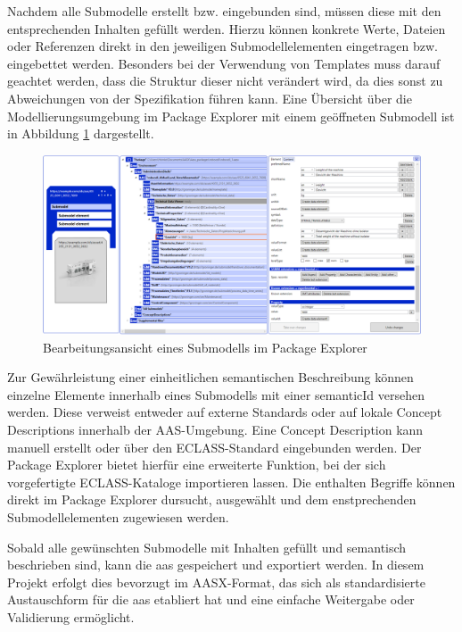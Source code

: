 Nachdem alle Submodelle erstellt bzw. eingebunden sind, müssen diese mit den entsprechenden Inhalten gefüllt werden.
Hierzu können konkrete Werte, Dateien oder Referenzen direkt in den jeweiligen Submodellelementen eingetragen bzw. eingebettet werden.
Besonders bei der Verwendung von Templates muss darauf geachtet werden, dass die Struktur dieser nicht verändert wird, da dies sonst zu Abweichungen von der Spezifikation führen kann.
Eine Übersicht über die Modellierungsumgebung im Package Explorer mit einem geöffneten Submodell ist in Abbildung \ref{fig:BearbeitungsansichtPackageExplorer} dargestellt.

\begin{figure}[htbp]
    \centering
    \includegraphics[width=1\textwidth]{Bilder/ModellierungAAS/neu.PNG}
    \caption{Bearbeitungsansicht eines Submodells im Package Explorer}
    \label{fig:BearbeitungsansichtPackageExplorer}
\end{figure}

Zur Gewährleistung einer einheitlichen semantischen Beschreibung können einzelne Elemente innerhalb eines Submodells mit einer semanticId versehen werden.
Diese verweist entweder auf externe Standards oder auf lokale Concept Descriptions innerhalb der AAS-Umgebung.
Eine Concept Description kann manuell erstellt oder über den ECLASS-Standard eingebunden werden.
Der Package Explorer bietet hierfür eine erweiterte Funktion, bei der sich vorgefertigte ECLASS-Kataloge importieren lassen.
Die enthalten Begriffe können direkt im Package Explorer dursucht, ausgewählt und dem enstprechenden Submodellelementen zugewiesen werden.

Sobald alle gewünschten Submodelle mit Inhalten gefüllt und semantisch beschrieben sind, kann die \acs{aas} gespeichert und exportiert werden.
In diesem Projekt erfolgt dies bevorzugt im AASX-Format, das sich als standardisierte Austauschform für die \acs{aas} etabliert hat und eine einfache Weitergabe oder Validierung ermöglicht.




